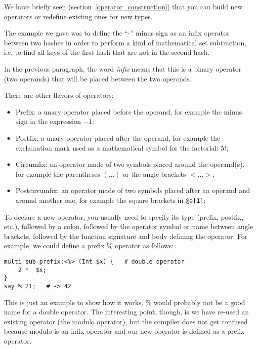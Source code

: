We have briefly seen (section~\ref{operator_construction}) 
that you can build new operators or redefine existing ones 
for new types.

The example we gave was to define the ``-'' minus sign 
as an infix operator between two hashes in order to 
perform a kind of mathematical set subtraction, i.e. 
to find all keys of the first hash that are not in the 
second hash.

In the previous paragraph, the word \emph{infix} means 
that this is a binary operator (two operands) that will 
be placed between the two operands. 

There are other flavors of operators:
\begin{itemize}
\item Prefix: a unary operator placed before the operand, 
for example the minus sign in the expression $-1$;

\item Postfix: a unary operator placed after the operand, 
for example the exclamation mark used as a mathematical  
symbol for the factorial: $5!$;

\item Circumfix: an operator made of two symbols placed 
around the operand(s), for example the parentheses $(...)$ 
or the angle brackets $<...>$;

\item Postcircumfix: an operator made of two symbols placed 
after an operand and around another one, for example the 
square brackets in \verb'@a[1]';
\end{itemize}

To declare a new operator, you usually need to specify 
its type (prefix, postfix, etc.), followed by a colon, 
followed by the operator symbol or name between angle brackets, 
followed by the function signature and body defining 
the operator. For example, we could define a prefix \% 
operator as follows:

\begin{verbatim}
multi sub prefix:<%> (Int $x) {   # double operator
    2 *  $x;
}
say % 21;   # -> 42
\end{verbatim}

This is just an example to show how it works, \% would 
probably not be a good name for a double operator. The 
interesting point, though, is we have re-used an existing 
operator (the modulo operator), but the compiler does not 
get confused because modulo is an infix operator and our 
new operator is defined as a prefix operator.

